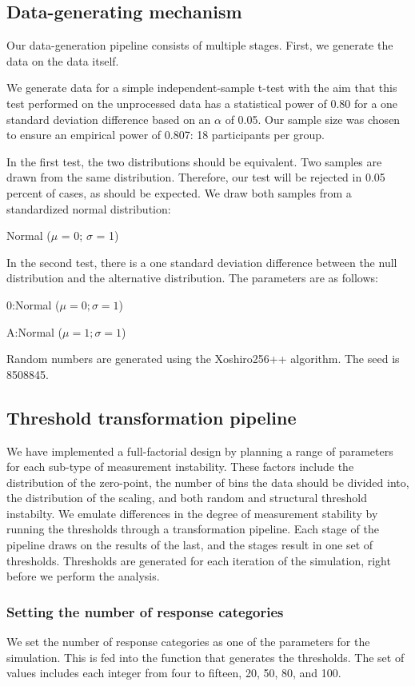 \documentclass[utf8]{FrontiersinVancouver}
\begin{document}
\subsection{Data-generating mechanism}
Our data-generation pipeline consists of multiple stages. First, we generate the data on the data itself. 

We generate data for a simple independent-sample t-test with the aim that this test performed on the unprocessed data has a statistical power of 0.80 for a one standard deviation difference based on an $\alpha$ of 0.05. Our sample size was chosen to ensure an empirical power of 0.807: 18 participants per group.  

In the first test, the two distributions should be equivalent. Two samples are drawn from the same distribution. Therefore, our test will be rejected in 0.05 percent of cases, as should be expected. We draw both samples from a standardized normal distribution:

    \centerline{Normal ($\mu$ = 0; $\sigma$ = 1)}

In the second test, there is a one standard deviation difference between the null distribution and the alternative distribution. The parameters are as follows:


    \centerline{0:\@ Normal ($\mu = 0; \sigma = 1$)}
    \centerline{A:\@ Normal ($\mu = 1; \sigma = 1$)}

Random numbers are generated using the Xoshiro256++ algorithm. The seed is 8508845.

\subsection{Threshold transformation pipeline}
We have implemented a full-factorial design by planning a range of parameters for each sub-type of measurement instability. These factors include the distribution of the zero-point, the number of bins the data should be divided into, the distribution of the scaling, and both random and structural threshold instabilty. We emulate differences in the degree of measurement stability by running the thresholds through a transformation pipeline. Each stage of the pipeline draws on the results of the last, and the stages result in one set of thresholds. Thresholds are generated for each iteration of the simulation, right before we perform the analysis.  

\subsubsection{Setting the number of response categories}
We set the number of response categories as one of the parameters for the simulation. This is fed into the function that generates the thresholds. The set of values includes each integer from four to fifteen, 20, 50, 80, and 100.
\end{document}
